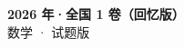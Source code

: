 \documentclass[zihao=-4, a4paper]{ctexart}
\begin{document}
\begin{center}
  {\Large\bfseries 2026 年·全国 1 卷（回忆版）}\\[4pt]
  {\large 数学 · 试题版}
\end{center}
\medskip
{}

\end{document}
